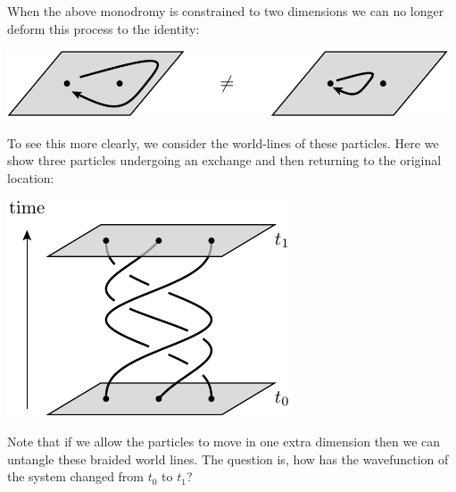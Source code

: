 \documentclass[aps, prl, letterpaper, twocolumn, superscriptaddress, notitlepage, 10pt]{revtex4-1}
\begin{document}
When the above monodromy is constrained to two dimensions
we can no longer deform this process to the identity:
\begin{center}
\includegraphics[]{pic-monodromy2d.pdf}
\end{center}

To see this more clearly,
we consider the world-lines of these particles.
Here we show three particles undergoing an exchange and then
returning to the original location:
\begin{center}
\includegraphics[]{pic-braid-worldlines.pdf}
\end{center}
Note that if we allow the particles to move in one extra
dimension then we can untangle these braided world lines.
The question is, how has the wavefunction of the system
changed from $t_0$ to $t_1$?
\end{document}
